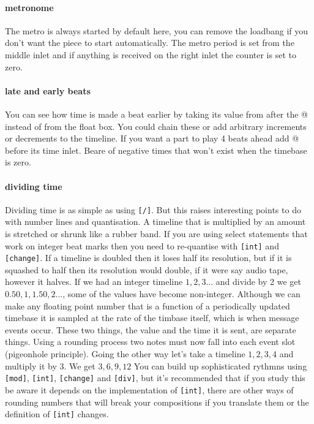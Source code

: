 \paragraph{metronome}
The metro is always started by default here, you can remove the loadbang 
if you don't want the piece to start automatically. The metro period
is set from the middle inlet and if anything is received on the right
inlet the counter is set to zero.

\paragraph{late and early beats}
You can see how time is made a beat earlier by taking its value
from after the \verb@[+ 1]@ instead of from the float box. You could 
chain these or add arbitrary increments or decrements to the timeline.
If you want a part to play 4 beats ahead add \verb@[+ 4]@ before its time inlet.
Beare of negative times that won't exist when the timebase is zero.

 
\paragraph{dividing time} 
 Dividing time is as simple as using \verb+[/]+. But this raises
 interesting points to do with number lines and quantisation.
 A timeline that is multiplied by an amount is stretched or shrunk
 like a rubber band. If you are using select statements that work
 on integer beat marks then you need to re-quantise with \verb+[int]+
 and \verb+[change]+. If a timeline is doubled then it loses half
 its resolution, but if it is squashed to half then its resolution
 would double, if it were say audio tape, however it halves.
 If we had an integer timeline ${1, 2, 3 ...}$ and divide by 2
 we get ${0.50, 1, 1.50, 2 ...}$, some of the values have become 
 non-integer. Although we can make any floating point number that
 is a function of a periodically updated timebase it
 is sampled at the rate of the timbase itself, which is when 
 message events occur. These two things, the value and the time it
 is sent, are separate things. Using a rounding process two notes must now
 fall into each event slot (pigeonhole principle). Going the other
 way let's take a timeline ${1, 2, 3, 4}$ and multiply it by
 3. We get ${3, 6, 9, 12}$ You can build up
 sophisticated rythmns using \verb+[mod]+, \verb+[int]+,
 \verb+[change]+ and \verb+[div]+, but it's recommended that if
 you study this be aware it depends on the implementation
 of \verb+[int]+, there are other ways of rounding numbers
 that will break your compositions if you translate them or 
 the definition of \verb+[int]+ changes.
